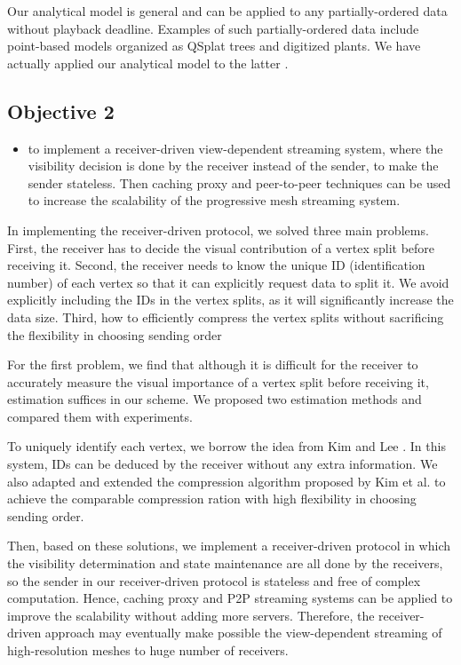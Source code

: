 \documentclass[11pt, a4paper]{report}
\begin{document}
    Our analytical model is general and can be applied to any 
    partially-ordered data without playback deadline.
    Examples of such partially-ordered data include point-based models 
    organized as QSplat trees \cite{rusinkiewicz:qsplat} and digitized plants.  
    We have actually applied our analytical model to the latter \cite{plant:seb}.
    
    \subsection{Objective 2}
    \begin{itemize}
        \item
            to implement 
            a receiver-driven view-dependent streaming system, where
            the visibility decision is done by the receiver instead of the sender,
            to make the sender stateless.
            Then caching proxy and peer-to-peer techniques can be used to increase the 
            scalability of the progressive mesh streaming system.
    \end{itemize}
    
    In implementing the receiver-driven protocol, we solved three main problems.
    First, the receiver has to decide the visual contribution 
    of a vertex split before receiving it.
    Second, the receiver needs to know the unique ID
    (identification number) of each vertex so that it
    can explicitly request data to split it. 
    We avoid explicitly including the IDs in the vertex splits,
    as it will significantly increase the data size.
    Third, how to efficiently compress the vertex splits without
    sacrificing the flexibility in choosing sending order
    
    For the first problem, we find that although it is difficult
    for the receiver to accurately measure
    the visual importance of a vertex split before receiving it, 
    estimation suffices in our scheme. 
    We proposed two estimation methods and compared them with experiments.
    
    To uniquely identify each vertex, we borrow the idea from Kim and Lee \cite{kim01truly}.
    In this system, IDs can be deduced by the receiver without any extra information. 
    We also adapted and extended the compression algorithm proposed by Kim et al. \cite{multiresolution:kim}
    to achieve the comparable compression ration with high flexibility in choosing 
    sending order.
    
    Then, based on these solutions, we implement a receiver-driven protocol in which 
    the visibility determination and state maintenance are all done by the receivers, so 
    the sender in our receiver-driven protocol is stateless and free of complex computation.
    Hence, caching proxy and P2P streaming systems can be applied to improve
    the scalability without adding more servers.  
    Therefore, the receiver-driven approach may eventually
    make possible the view-dependent streaming of high-resolution meshes to huge number of receivers.
    
\end{document}
